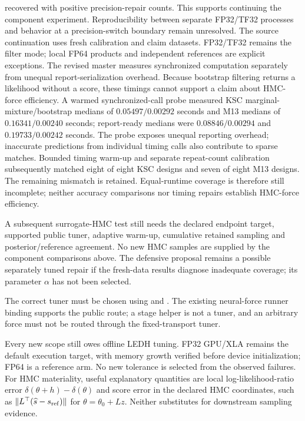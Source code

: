 \documentclass[11pt]{article}
\begin{document}
recovered with positive precision-repair counts. This supports continuing the
component experiment. Reproducibility between separate FP32/TF32 processes
and behavior at a precision-switch boundary remain unresolved.
The source continuation uses fresh calibration and claim datasets.
FP32/TF32 remains the filter mode; local FP64 products and independent
references are explicit exceptions. The revised master measures synchronized
computation separately from unequal report-serialization overhead.
Because bootstrap filtering returns a likelihood without a score, these
timings cannot support a claim about HMC-force efficiency. A warmed
synchronized-call probe measured KSC marginal-mixture/bootstrap medians of
$0.05497/0.00292$ seconds and M13 medians of $0.16341/0.00240$ seconds;
report-ready medians were $0.08846/0.00294$ and $0.19733/0.00242$ seconds.
The probe exposes unequal reporting overhead; inaccurate predictions from
individual timing calls also contribute to sparse matches. Bounded timing
warm-up and separate repeat-count calibration subsequently matched eight of
eight KSC designs and seven of eight M13 designs. The remaining mismatch is
retained. Equal-runtime coverage is therefore still incomplete; neither
accuracy comparisons nor timing repairs establish HMC-force efficiency.

A subsequent surrogate-HMC test still needs the declared endpoint target,
supported public tuner, adaptive warm-up, cumulative retained sampling and
posterior/reference agreement. No new HMC samples are supplied by the
component comparisons above. The defensive proposal remains a possible
separately tuned repair if the fresh-data results diagnose inadequate
coverage; its parameter $\alpha$ has not been selected.

The correct tuner must be chosen using
 and
.
The existing neural-force runner binding supports the public
 route; a stage helper is not a tuner, and an
arbitrary force must not be routed through the fixed-transport tuner.

Every new scope still owes offline LEDH tuning. FP32 GPU/XLA remains the
default execution target, with memory growth verified before device
initialization; FP64 is a reference arm. No new tolerance is selected from
the observed failures. For HMC materiality, useful explanatory quantities
are local log-likelihood-ratio error
$\delta(\theta+h)-\delta(\theta)$ and score error in the declared HMC
coordinates, such as $\|L^\top(\widehat s-s_{\rm ref})\|$ for
$\theta=\theta_0+Lz$. Neither substitutes for downstream sampling evidence.
\end{document}
